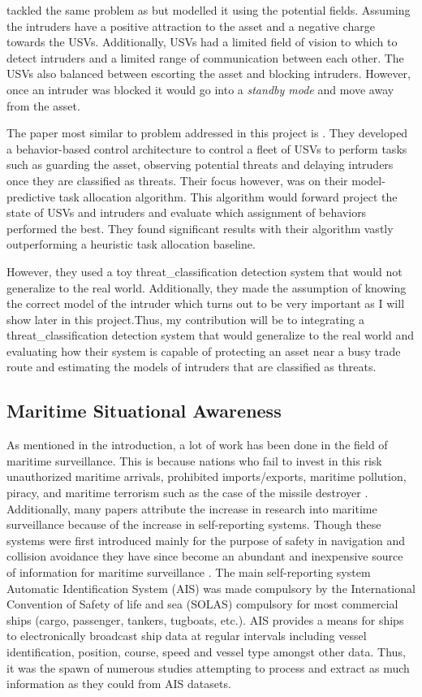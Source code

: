 \documentclass[bsc,frontabs,twoside,singlespacing,parskip,deptreport]{infthesis}     %
\begin{document}
\cite{moundegue2017fields} tackled the same problem as \cite{gupta2015block} but modelled it using the potential fields. Assuming the intruders have a positive attraction to the asset and a negative charge towards the USVs. Additionally, USVs had a limited field of vision to which to detect intruders and a limited range of communication between each other. The USVs also balanced between escorting the asset and blocking intruders. However, once an intruder was blocked it would go into a \emph{standby mode} and move away from the asset.

The paper most similar to problem addressed in this project is \cite{raboin2013model}. They developed a behavior-based control architecture to control a fleet of USVs to perform tasks such as guarding the asset, observing potential threats and delaying intruders once they are classified as threats. Their focus however, was on their model-predictive task allocation algorithm. This algorithm would forward project the state of USVs and intruders and evaluate which assignment of behaviors performed the best. They found significant results with their algorithm vastly outperforming a heuristic task allocation baseline. 

However, they used a toy threat_classification detection system that would not generalize to the real world. Additionally, they made the assumption of knowing the correct model of the intruder which turns out to be very important as I will show later in this project.Thus, my contribution will be to integrating a threat_classification detection system that would generalize to the real world and evaluating how their system is capable of protecting an asset near a busy trade route and estimating the models of intruders that are classified as threats.

\subsection{Maritime Situational Awareness}
As mentioned in the introduction, a lot of work has been done in the field of maritime surveillance. This is because nations who fail to invest in this risk unauthorized maritime arrivals, prohibited imports/exports, maritime pollution, piracy, and maritime terrorism \cite{ristic2008statistical} such as the case of the missile destroyer \cite{combs2009encyclopedia}. Additionally, many papers attribute the increase in research into maritime surveillance because of the increase in self-reporting systems. Though these systems were first introduced mainly for the purpose of safety in navigation and collision avoidance they have since become an abundant and inexpensive source of information for maritime surveillance  \cite{kde}. The main self-reporting system Automatic Identification System (AIS) was made compulsory by the International Convention of Safety of life and sea (SOLAS) compulsory for most commercial ships (cargo, passenger, tankers, tugboats, etc.). AIS provides a means for ships to electronically broadcast ship data at regular intervals including vessel identification, position, course, speed and vessel type amongst other data. Thus, it was the spawn of numerous studies attempting to process and extract as much information as they could from AIS datasets. 
\end{document}
